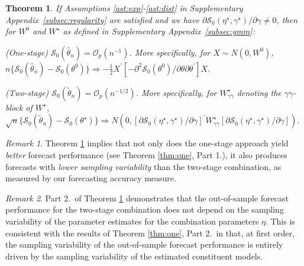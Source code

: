 \documentclass[12pt]{article}
\newtheorem{theorem}{Theorem}
\theoremstyle{definition}
\theoremstyle{remark}
\newtheorem{remark}{Remark}
\renewcommand{\appendixname}{Supplementary Appendix}
\begin{document}
\begin{theorem}
\label{thm:two} If Assumptions \ref{ast:exp}-\ref{ast:dist} in \appendixname\ \ref{subsec:regularity} are satisfied and we have $\partial \mathcal{S}_0(\eta^{\star}, \gamma^{\star}) / \partial \gamma\allowbreak \ne 0$, then for $W^0$ and $W^{\star}$ as defined in \appendixname\ \ref{subsec:gmm}:

\smallskip

\noindent(One-stage) $\mathcal{S}_0(\hat{\theta}_n) = \mathcal{O}_p(n^{-1})$. More specifically, for $X\sim N(0, W^0)$, \\ $n \lbrace \mathcal{S}_0(\hat{\theta}_{n}) - \mathcal{S}_0(\theta^0) \rbrace \Rightarrow - \frac{1}{2} X^{\prime} \left[ - \partial^2 \mathcal{S}_{0}(\theta^0) / \partial \theta \partial \theta^{\prime} \right] X.$

\smallskip

\noindent(Two-stage) $\mathcal{S}_0(\tilde{\theta}_n) = \mathcal{O}_p(n^{-1/2}) $. More specifically, for $W^\star_{\gamma\gamma}$ denoting the $\gamma\gamma$-block of $W^\star$, \\ $\sqrt{n} \lbrace \mathcal{S}_0(\tilde{\theta}_{n}) - \mathcal{S}_{0}(\theta^{\star}) \rbrace \Rightarrow N(0, [\partial \mathcal{S}_{0}(\eta^{\star}, \gamma^{\star}) / \partial \gamma]^{\prime} W^{\star}_{\gamma \gamma} [\partial \mathcal{S}_0(\eta^{\star}, \gamma^{\star}) / \partial \gamma]).$

\end{theorem}

\begin{remark}
\label{rmk:rateofconvergence} Theorem \ref{thm:two} implies that not only does the one-stage approach yield \textit{better} forecast performance (see Theorem \ref{thm:one}, Part 1.), it also produces forecasts with \textit{lower sampling variability} than the two-stage combination, as measured by our forecasting accuracy measure.
\end{remark}

\begin{remark}
Part 2.\ of Theorem \ref{thm:two} demonstrates that the out-of-sample forecast performance for the two-stage combination does not depend on the sampling variability of the parameter estimates for the combination parameters $\eta $. This is consistent with the results of Theorem \ref{thm:one}, Part 2.\ in that, at first order, the sampling variability of the out-of-sample forecast performance is entirely driven by the sampling variability of the estimated constituent models.
\end{remark}
\end{document}
